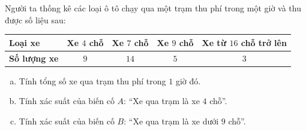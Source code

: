 \begin{bt}%
Người ta thống kê các loại ô tô chạy qua một trạm thu phí trong một giờ và thu được số liệu sau:
\begin{center}
\begin{tabular}{|l|c|c|c|c|}
\hline
\textbf{Loại xe} & Xe $4$ chỗ & Xe $7$ chỗ & Xe $9$ chỗ & Xe từ $16$ chỗ trở lên \\ \hline
\textbf{Số lượng xe} & $9$ & $14$ & $5$ & $3$ \\ \hline
\end{tabular}
\end{center}
\begin{enumerate}[a)]
    \item Tính tổng số xe qua trạm thu phí trong $1$ giờ đó.
    \item Tính xác suất của biến cố $A$: ``Xe qua trạm là xe $4$ chỗ''.
    \item Tính xác suất của biến cố $B$: ``Xe qua trạm là xe dưới $9$ chỗ''.
\end{enumerate}
\end{bt}


